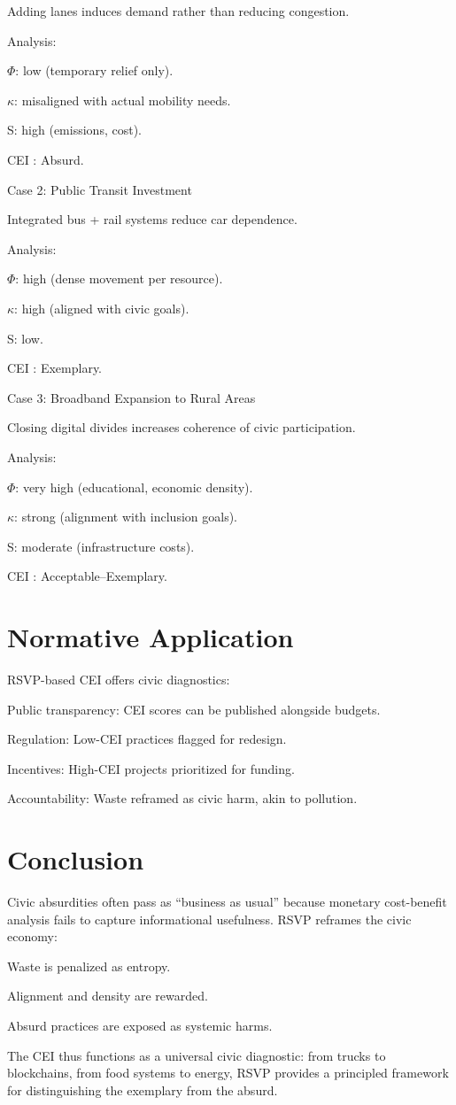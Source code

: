 \documentclass{book}
\begin{document}
Adding lanes induces demand rather than reducing congestion.

Analysis:

\(\Phi\): low (temporary relief only).

\(\kappa\): misaligned with actual mobility needs.

S: high (emissions, cost).

CEI : Absurd.

Case 2: Public Transit Investment

Integrated bus + rail systems reduce car dependence.

Analysis:

\(\Phi\): high (dense movement per resource).

\(\kappa\): high (aligned with civic goals).

S: low.

CEI : Exemplary.

Case 3: Broadband Expansion to Rural Areas

Closing digital divides increases coherence of civic participation.

Analysis:

\(\Phi\): very high (educational, economic density).

\(\kappa\): strong (alignment with inclusion goals).

S: moderate (infrastructure costs).

CEI : Acceptable–Exemplary.

\section{Normative Application}

RSVP-based CEI offers civic diagnostics:

Public transparency: CEI scores can be published alongside budgets.

Regulation: Low-CEI practices flagged for redesign.

Incentives: High-CEI projects prioritized for funding.

Accountability: Waste reframed as civic harm, akin to pollution.

\section{Conclusion}

Civic absurdities often pass as “business as usual” because monetary cost-benefit analysis fails to capture informational usefulness. RSVP reframes the civic economy:

Waste is penalized as entropy.

Alignment and density are rewarded.

Absurd practices are exposed as systemic harms.

The CEI thus functions as a universal civic diagnostic: from trucks to blockchains, from food systems to energy, RSVP provides a principled framework for distinguishing the exemplary from the absurd.

\newpage


\end{document}
